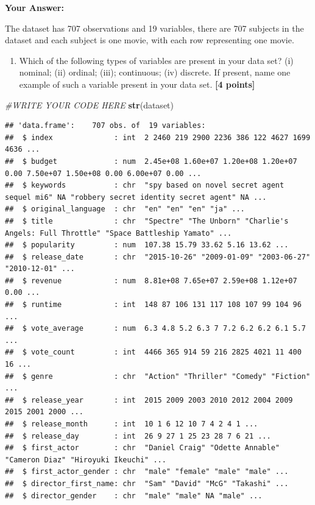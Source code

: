 \documentclass[
]{article}
\newenvironment{Shaded}{\begin{snugshade}}{\end{snugshade}}
\newcommand{\CommentTok}[1]{\textcolor[rgb]{0.56,0.35,0.01}{\textit{#1}}}
\newcommand{\FunctionTok}[1]{\textcolor[rgb]{0.13,0.29,0.53}{\textbf{#1}}}
\newcommand{\NormalTok}[1]{#1}
\providecommand{\tightlist}{%
  \setlength{\itemsep}{0pt}\setlength{\parskip}{0pt}}
\begin{document}
\textbf{Your Answer:}

The dataset has 707 observations and 19 variables, there are 707
subjects in the dataset and each subject is one movie, with each row
representing one movie.

\begin{enumerate}
\def\labelenumi{\arabic{enumi}.}
\setcounter{enumi}{1}
\tightlist
\item
  Which of the following types of variables are present in your data
  set? (i) nominal; (ii) ordinal; (iii); continuous; (iv) discrete. If
  present, name one example of such a variable present in your data set.
  \textbf{[4 points]}
\end{enumerate}

\begin{Shaded}
\begin{Highlighting}[]
\CommentTok{\#WRITE YOUR CODE HERE}
\FunctionTok{str}\NormalTok{(dataset)}
\end{Highlighting}
\end{Shaded}

\begin{verbatim}
## 'data.frame':    707 obs. of  19 variables:
##  $ index              : int  2 2460 219 2900 2236 386 122 4627 1699 4636 ...
##  $ budget             : num  2.45e+08 1.60e+07 1.20e+08 1.20e+07 0.00 7.50e+07 1.50e+08 0.00 6.00e+07 0.00 ...
##  $ keywords           : chr  "spy based on novel secret agent sequel mi6" NA "robbery secret identity secret agent" NA ...
##  $ original_language  : chr  "en" "en" "en" "ja" ...
##  $ title              : chr  "Spectre" "The Unborn" "Charlie's Angels: Full Throttle" "Space Battleship Yamato" ...
##  $ popularity         : num  107.38 15.79 33.62 5.16 13.62 ...
##  $ release_date       : chr  "2015-10-26" "2009-01-09" "2003-06-27" "2010-12-01" ...
##  $ revenue            : num  8.81e+08 7.65e+07 2.59e+08 1.12e+07 0.00 ...
##  $ runtime            : int  148 87 106 131 117 108 107 99 104 96 ...
##  $ vote_average       : num  6.3 4.8 5.2 6.3 7 7.2 6.2 6.2 6.1 5.7 ...
##  $ vote_count         : int  4466 365 914 59 216 2825 4021 11 400 16 ...
##  $ genre              : chr  "Action" "Thriller" "Comedy" "Fiction" ...
##  $ release_year       : int  2015 2009 2003 2010 2012 2004 2009 2015 2001 2000 ...
##  $ release_month      : int  10 1 6 12 10 7 4 2 4 1 ...
##  $ release_day        : int  26 9 27 1 25 23 28 7 6 21 ...
##  $ first_actor        : chr  "Daniel Craig" "Odette Annable" "Cameron Diaz" "Hiroyuki Ikeuchi" ...
##  $ first_actor_gender : chr  "male" "female" "male" "male" ...
##  $ director_first_name: chr  "Sam" "David" "McG" "Takashi" ...
##  $ director_gender    : chr  "male" "male" NA "male" ...
\end{verbatim}
\end{document}
